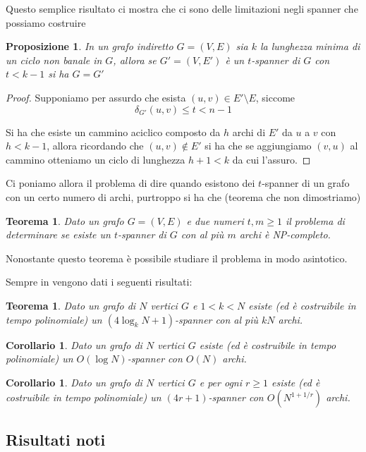 \documentclass[a4paper,10pt]{amsbook}
\newcounter{counter1}
\theoremstyle{plain}
\newtheorem{myteo}[counter1]{Teorema}
\newtheorem{mypro}[counter1]{Proposizione}
\newtheorem{mycor}[counter1]{Corollario}
\theoremstyle{definition}
\theoremstyle{remark}
\newcommand{\pa}[1]{\left(#1\right)}
\begin{document}
Questo semplice risultato ci mostra che ci sono delle limitazioni
negli spanner che possiamo costruire
\begin{mypro}
  In un grafo indiretto $G = (V,E)$ sia $k$ la lunghezza minima di un
  ciclo non banale in $G$, allora se $G' = (V,E')$ \`e un $t$-spanner
  di $G$ con $t < k-1$ si ha $G = G'$
\end{mypro}
\begin{proof}
  Supponiamo per assurdo che esista $(u,v) \in E' \setminus E$,
  siccome
  \[ \delta_{G'} (u,v) \le t < n -1 \] 

  Si ha che esiste un cammino aciclico composto da $h$ archi di $E'$
  da $u$ a $v$ con $h<k-1$, allora ricordando che $(u,v) \not\in E'$
  si ha che se aggiungiamo $(v,u)$ al cammino otteniamo un ciclo di
  lunghezza $h+1 < k$ da cui l'assuro.
\end{proof}

Ci poniamo allora il problema di dire quando esistono dei $t$-spanner
di un grafo con un certo numero di archi, purtroppo si ha che (teorema
che non dimostriamo)
\begin{myteo}
  Dato un grafo $G = (V,E)$ e due numeri $t,m\ge 1$ il problema di
  determinare se esiste un $t$-spanner di $G$ con al pi\`u $m$ archi
  \`e NP-completo.
\end{myteo}

Nonostante questo teorema \`e possibile studiare il problema in modo
asintotico.

Sempre in \cite{graphspanners} vengono dati i seguenti risultati:

\begin{myteo}
  Dato un grafo di $N$ vertici $G$ e $1<k<N$ esiste (ed \`e
  costruibile in tempo polinomiale) un $(4\log _k N +1)$-spanner con
  al pi\`u $kN$ archi.
\end{myteo}

\begin{mycor}
  Dato un grafo di $N$ vertici $G$ esiste (ed \`e costruibile in tempo
  polinomiale) un $O\pa{\log N}$-spanner con $O(N)$ archi.
\end{mycor}

\begin{mycor}
  Dato un grafo di $N$ vertici $G$ e per ogni $r\ge 1$ esiste (ed \`e
  costruibile in tempo polinomiale) un $(4r+1)$-spanner con
  $O(N^{1+1/r})$ archi.
\end{mycor}


\subsection{Risultati noti}
\end{document}

